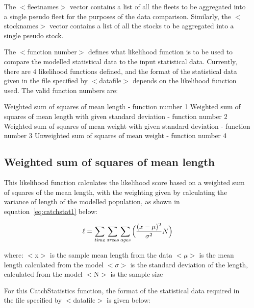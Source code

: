 \documentclass [a4paper, 10pt]{book}
\begin{document}
\bigskip
The $<$fleetnames$>$ vector contains a list of all the fleets to be aggregated into a single pseudo fleet for the purposes of the data comparison.  Similarly, the $<$stocknames$>$ vector contains a list of all the stocks to be aggregated into a single pseudo stock.

\bigskip
The $<$function number$>$ defines what likelihood function is to be used to compare the modelled statistical data to the input statistical data.  Currently, there are 4 likelihood functions defined, and the format of the statistical data given in the file specified by $<$datafile$>$ depends on the likelihood function used.  The valid function numbers are:

\bigskip
Weighted sum of squares of mean length - function number 1\newline
Weighted sum of squares of mean length with given standard deviation - function number 2\newline
Weighted sum of squares of mean weight with given standard deviation - function number 3\newline
Unweighted sum of squares of mean weight - function number 4\newline

\subsection{Weighted sum of squares of mean length}
This likelihood function calculates the likelihood score based on a weighted sum of squares of the mean length, with the weighting given by calculating the variance of length of the modelled population, as shown in equation~\ref{eq:catchstat1} below:

\begin{equation}\label{eq:catchstat1}
\ell = \sum_{\it time}\sum_{\it areas}\sum_{\it ages} \Big(\frac{(x-\mu)^2} {\sigma^2} N\Big)
\end{equation}

where:\newline
$<$x$>$ is the sample mean length from the data\newline
$<$$\mu$$>$ is the mean length calculated from the model\newline
$<$$\sigma$$>$ is the standard deviation of the length, calculated from the model\newline
$<$N$>$ is the sample size

\bigskip
For this CatchStatistics function, the format of the statistical data required in the file specified by $<$datafile$>$ is given below:
\end{document}

